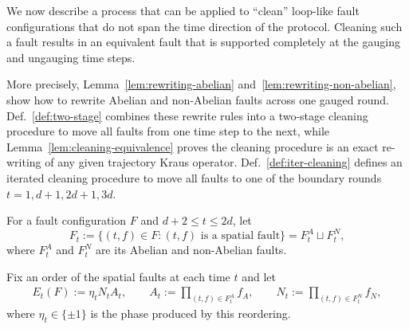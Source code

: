 \documentclass[11pt]{article}
\begin{document}
We now describe a process that can be applied to ``clean'' loop-like fault configurations that do not span the time direction of the protocol. Cleaning such a fault results in an equivalent fault that is supported completely at the gauging and ungauging time steps. 

More precisely, Lemma~\ref{lem:rewriting-abelian} and~\ref{lem:rewriting-non-abelian}, show how to rewrite Abelian and non-Abelian faults across one gauged round.
Def.~\ref{def:two-stage} combines these rewrite rules into a two-stage cleaning procedure to move all faults from one time step to the next, while Lemma~\ref{lem:cleaning-equivalence} proves the cleaning procedure is an exact re-writing of any given trajectory Kraus operator.
Def.~\ref{def:iter-cleaning} defines an iterated cleaning procedure to move all faults to one of the boundary rounds $t = 1, d+1, 2d+1, 3d$.

For a fault configuration $F$ and $d+2\le t\le 2d$, let
\[
F_t:=\{(t,f)\in F : (t,f) \text{ is a spatial fault}\}=F_t^A \sqcup F_t^N,
\]
where $F_t^A$ and $F_t^N$ are its Abelian and non-Abelian faults. 

Fix an order of the spatial faults at each time $t$ and let
\begin{align}
E_t(F) := \eta_t N_tA_t,\qquad A_t :=\prod_{(t,f)\in F_t^A}f_A,\qquad 
N_t:=\prod_{(t,f)\in F_t^N}f_N,
\label{eq:Et-At-Nt}
\end{align}
where $\eta_t \in \{\pm 1\}$ is the phase produced by this reordering.
\end{document}
